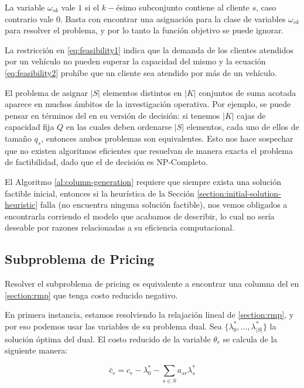 La variable $\omega_{sk}$ vale $1$ si el $k-$ésimo subconjunto contiene al cliente $s$, caso contrario vale $0$. Basta con encontrar una asignación para la clase de variables $\omega_{sk}$ para resolver el problema, y por lo tanto la función objetivo se puede ignorar. 

La restricción en \ref{eq:feasibility1} indica que la demanda de los clientes atendidos por un vehículo no pueden superar la capacidad del mismo y la ecuación \ref{eq:feasibility2} prohíbe que un cliente sea atendido por más de un vehículo. 

El problema de asignar $|S|$ elementos distintos en $|K|$ conjuntos de suma acotada aparece en muchos ámbitos de la investigación operativa. Por ejemplo, se puede pensar en términos del  en su versión de decisión: si tenemos $|K|$ cajas de capacidad fija $Q$ en las cuales deben ordenarse $|S|$ elementos, cada uno de ellos de tamaño $q_s$, entonces ambos problemas son equivalentes. Esto nos hace sospechar que no existen algoritmos eficientes que resuelvan de manera exacta el problema de factibilidad, dado que el  de decisión es NP-Completo. 

El Algoritmo \ref{al:column-generation} requiere que siempre exista una solución factible inicial, entonces si la heurística de la Sección \ref{section:initial-solution-heuristic} falla (no encuentra ninguna solución factible), nos vemos obligados a encontrarla corriendo el modelo que acabamos de describir, lo cual no sería deseable por razones relacionadas a su eficiencia computacional.


\subsection{Subproblema de Pricing}

Resolver el subproblema de pricing es equivalente a encontrar una columna del  en \ref{section:rmp} que tenga costo reducido negativo.

En primera instancia, estamos resolviendo la relajación lineal de \ref{section:rmp}, y por eso podemos usar las variables de su problema dual. Sea $\{\lambda^*_0, \dots, \lambda^*_{|S|}\}$ la solución óptima del dual. 
El costo reducido de la variable $\theta_r$ se calcula de la siguiente manera:

\begin{equation}
    \bar{c}_r = c_r - \lambda^*_0 - \sum_{s \in S}{a_{sr}\lambda^*_s} 
\end{equation}

